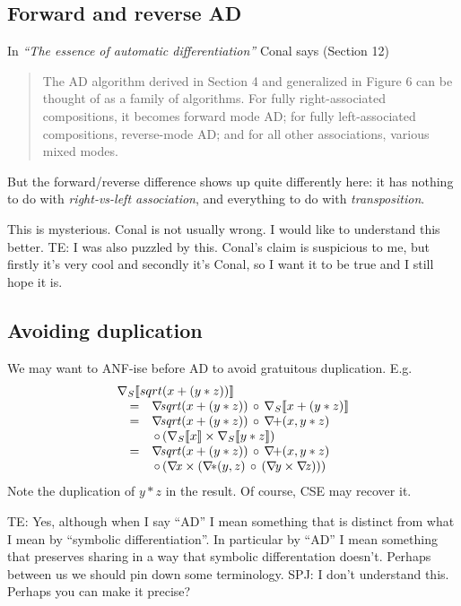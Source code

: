 \documentclass[sigplan,review]{acmart}
\newcommand{\grad}[1]{\nabla_S\lb #1 \rb}  %
\newcommand{\gradf}[1]{\nabla\! \mathit{#1}}  %
\newcommand{\lb}{\llbracket}
\newcommand{\rb}{\rrbracket}
\newcommand{\lmcomp}{\,\circ\,}   %
\newcommand{\lmpair}{\times}         %
\newcommand{\simon}[1]{{\color{red}SPJ: #1}}
\newcommand{\tom}[1]{{\color{red}TE: #1}}
\begin{document}
\subsection{Forward and reverse AD}

In \emph{``The essence of automatic differentiation''} Conal says (Section 12)
\begin{quote}
The AD algorithm derived in Section 4 and generalized in Figure 6 can be thought of as a family
of algorithms. For fully right-associated compositions, it becomes forward mode AD; for fully
left-associated compositions, reverse-mode AD; and for all other associations, various mixed modes.
\end{quote}
But the forward/reverse difference shows up quite differently here: it has nothing to do
with \emph{right-vs-left association}, and everything to do with \emph{transposition}.

This is mysterious.  Conal is not usually wrong.  I would like to
understand this better.
\tom{I was also puzzled by this.  Conal's claim is suspicious to me,
  but firstly it's very cool and secondly it's Conal, so I want it to
  be true and I still hope it is.}

\subsection{Avoiding duplication}

We may want to ANF-ise before AD to avoid gratuitous duplication.
  E.g.
$$
  \begin{array}{rcl}
    \multicolumn{3}{l}{\grad{sqrt(x+(y*z))}} \\
      & = & \gradf{sqrt}(x+(y*z)) \lmcomp \grad{x+(y*z)} \\
    & = & \gradf{sqrt}(x+(y*z)) \lmcomp  \gradf{+}(x, y*z) \\
     && \lmcomp (\grad{x} \lmpair \grad{y*z}) \\
    & = & \gradf{sqrt}(x+(y*z)) \lmcomp \gradf{+}(x, y*z) \\
    & & \lmcomp (\gradf{x} \lmpair (\gradf{*}(y,z) \lmcomp (\gradf{y} \lmpair \gradf{z}))) \\
  \end{array}
  $$
Note the duplication of $y*z$ in the result.
Of course, CSE may recover it.

\tom{Yes, although when I say ``AD'' I mean something that is distinct
  from what I mean by ``symbolic differentiation''.  In particular by
  ``AD'' I mean something that preserves sharing in a way that
  symbolic differentation doesn't.  Perhaps between us we should pin
  down some terminology.} \simon{I don't understand this. Perhaps you can make
  it precise?}
\end{document}
